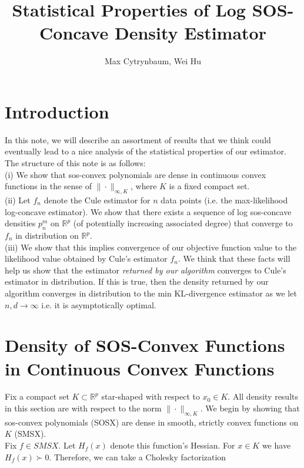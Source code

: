 \documentclass[11pt,reqno]{amsart}
\title{Statistical Properties of Log SOS-Concave Density Estimator}
\author{Max Cytrynbaum, Wei Hu}
\theoremstyle{definition}
\numberwithin{equation}{section}
\newcommand{\mr}{\mathbb{R}}
\begin{document}
\maketitle

\section{Introduction}

In this note, we will describe an assortment of results that we think could eventually lead to a nice analysis of the statistical properties of our estimator. The structure of this note is as follows: \\

(i) We show that sos-convex polynomials are dense in continuous convex functions in the sense of $\| \cdot \|_{\infty, K}$, where $K$ is a fixed compact set. \\

(ii) Let $f_n$ denote the Cule estimator for $n$ data points (i.e. the max-likelihood log-concave estimator). We show that there exists a sequence of log sos-concave densities $p_n^m$ on $\mr^p$ (of potentially increasing associated degree) that converge to $f_n$ in distribution on $\mr^p$. \\

(iii) We show that this implies convergence of our objective function value to the likelihood value obtained by Cule's estimator $f_n$. We think that these facts will help us show that the estimator \emph{returned by our algorithm} converges to Cule's estimator in distribution. If this is true, then the density returned by our algorithm converges in distribution to the min KL-divergence estimator as we let $n, d \to \infty$ i.e. it is asymptotically optimal. \\

\section{Density of SOS-Convex Functions in Continuous Convex Functions}

Fix a compact set $K \subset \mr^p$ star-shaped with respect to $x_0 \in K$. All density results in this section are with respect to the norm $\| \cdot \|_{\infty, K}$. We begin by showing that sos-convex polynomials (SOSX) are dense in smooth, strictly convex functions on $K$ (SMSX). \\

Fix $f \in SMSX$. Let $H_f(x)$ denote this function's Hessian. For $x \in K$ we have $H_f(x) \succ 0$. Therefore, we can take a Cholesky factorization 
\end{document}
